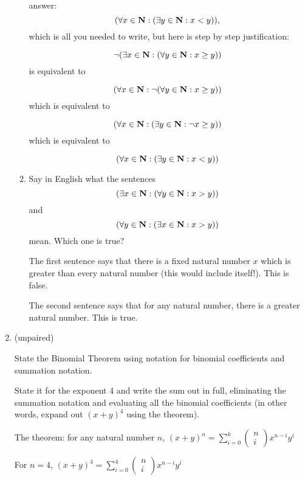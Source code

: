 \documentclass[12pt]{article}
\begin{document}
\begin{enumerate}
\begin{enumerate}
answer:  $$(\forall x \in {\bf N}:(\exists y \in {\bf N}: x < y)),$$
which is all you needed to write, but here is step by step justification:

$$\neg (\exists x \in {\bf N}:(\forall y \in {\bf N}: x \geq y))$$ is equivalent to

$$(\forall x \in {\bf N}:\neg (\forall y \in {\bf N}: x \geq y))$$ which is equivalent to

$$(\forall x \in {\bf N}:(\exists y \in {\bf N}: \neg x \geq y))$$ which is equivalent to

$$(\forall x \in {\bf N}:(\exists y \in {\bf N}: x < y))$$

\item  Say in English what the sentences  $$(\exists x \in {\bf N}:(\forall y \in {\bf N}: x >  y))$$  and $$(\forall y \in {\bf N}:(\exists x \in {\bf N}: x >  y))$$ mean.  Which one is true?

The first sentence says that there is a fixed natural number $x$ which is greater than every natural number (this would include itself!).  This is false.

The second sentence says that for any natural number, there is a greater natural number.  This is true.


\end{enumerate}

\newpage

\item  (unpaired) 

 State the Binomial Theorem using notation for binomial coefficients and summation notation.

State it for the exponent 4 and write the sum out in full, eliminating the summation notation and evaluating all the binomial coefficients (in other words, expand out $(x+y)^4$ using the theorem).

The theorem:  for any natural number $n$, $(x+y)^n = \sum_{i=0}^k \left(\begin{array}{c} n \\ i \end{array}\right)x^{n-i}y^i$

For $n=4$,  $(x+y)^4 = \sum_{i=0}^4 \left(\begin{array}{c} n \\ i \end{array}\right)x^{n-i}y^i$


\end{enumerate}
\end{document}
